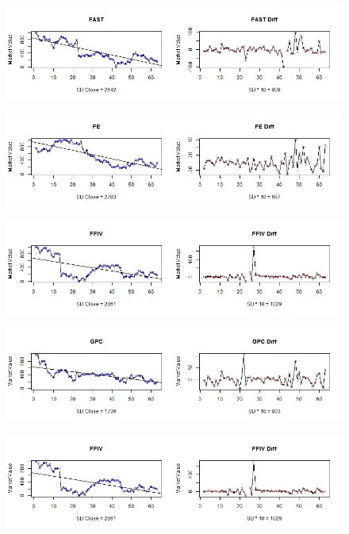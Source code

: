 \begin{figure}[!h]
	\includegraphics[scale=0.5]{images/appendixC/FAST_FRST.png}
\end{figure}

\begin{figure}[!h]
	\includegraphics[scale=0.5]{images/appendixC/FE_FRST.png}
\end{figure}

\begin{figure}[!h]
	\includegraphics[scale=0.5]{images/appendixC/FFIV_FRST.png}
\end{figure}

\begin{figure}[!h]
	\includegraphics[scale=0.5]{images/appendixC/GPC_FRST.png}
\end{figure}

\begin{figure}[!h]
	\includegraphics[scale=0.5]{images/appendixC/FFIV_FRST.png}
\end{figure}


